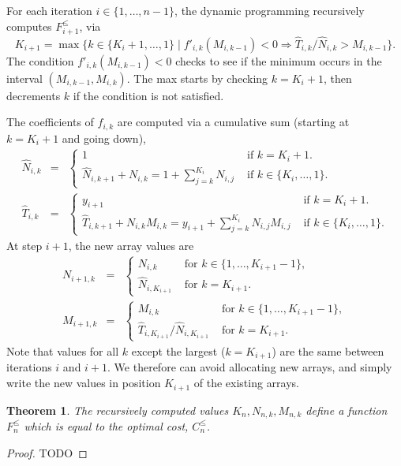 \documentclass[12pt]{article}
\newtheorem{theorem}{Theorem}
\begin{document}
For each iteration $i\in\{1, \dots, n-1\}$, the dynamic programming recursively computes $F_{i+1}^\leq$, via
\begin{equation}
  \label{eq:Kip1}
  K_{i+1} = \max\{
  k\in\{K_i+1,\dots,1\}
  \mid
  f'_{i,k}( M_{i,k-1} ) < 0
  \Rightarrow
  \hat T_{i,k}/\hat N_{i,k} > M_{i,k-1}
  \}.
\end{equation}
The condition $  f'_{i,k}( M_{i,k-1} ) < 0$ checks to see if the minimum occurs in the interval $(M_{i,k-1},M_{i,k})$.
The max starts by checking $k=K_i+1$, then decrements $k$ if the condition is not satisfied. 

The coefficients of $f_{i,k}$ are computed via a cumulative sum (starting at $k=K_i+1$ and going down),
\begin{eqnarray}
  \label{eq:cum}
  \hat N_{i, k} &=& 
  \begin{cases}
    1 & \text{ if } k=K_i+1.\\
    \hat N_{i, k+1} + N_{i,k} = 1+\sum_{j=k}^{K_i} N_{i,j} & \text{ if } k\in\{K_i,\dots,1\}.
  \end{cases}\\
  \hat T_{i, k} &=& 
  \begin{cases}
    y_{i+1} & \text{ if } k=K_i+1.\\
    \hat T_{i, k+1} + N_{i,k} M_{i,k} = y_{i+1}+\sum_{j=k}^{K_i} N_{i,j} M_{i,j} & \text{ if } k\in\{K_i,\dots,1\}.
  \end{cases}
\end{eqnarray}
At step $i+1$, the new array values are
\begin{eqnarray}
  \label{eq:Nip1}
  N_{i+1, k} &=& 
  \begin{cases}
    N_{i,k} & \text{ for } k\in\{1,\dots,K_{i+1}-1\},\\
    \hat N_{i,K_{i+1}} & \text{ for } k=K_{i+1}.
  \end{cases}  \\
  \label{eq:Mip1}
  M_{i+1, k} &=& 
  \begin{cases}
    M_{i,k} & \text{ for } k\in\{1,\dots,K_{i+1}-1\},\\
    \hat T_{i,K_{i+1}}/\hat N_{i,K_{i+1}} & \text{ for } k=K_{i+1}.
  \end{cases}  
\end{eqnarray}
Note that values for all $k$ except the largest ($k=K_{i+1}$) are the same between iterations $i$ and $i+1$.
We therefore can avoid allocating new arrays, and simply write the new values in position $K_{i+1}$ of the existing arrays.

\begin{theorem}
  The recursively computed values $K_n,N_{n,k},M_{n,k}$ define a function $F_n^\leq$ which is equal to the optimal cost, $C_{n}^\leq$.
\end{theorem}
\begin{proof}
TODO
\end{proof}
\end{document}
